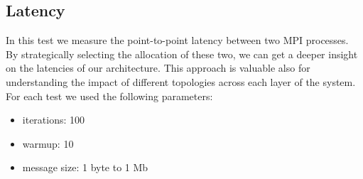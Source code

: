 \subsection{Latency}
    In this test we measure the point-to-point latency between two MPI
    processes. By strategically selecting the allocation of these two,
    we can get a deeper insight on the latencies of our architecture.
    This approach is valuable also for understanding the impact
    of different topologies across each layer of the system.
    For each test we used the following parameters:
    \begin{itemize}
        \item iterations: 100
        \item warmup: 10
        \item message size: 1 byte to 1 Mb
    \end{itemize}
